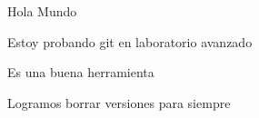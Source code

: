 \documentclass{article}
\begin{document}
Hola Mundo

Estoy probando git en laboratorio avanzado

Es una buena herramienta

Logramos borrar versiones para siempre
\end{document}

